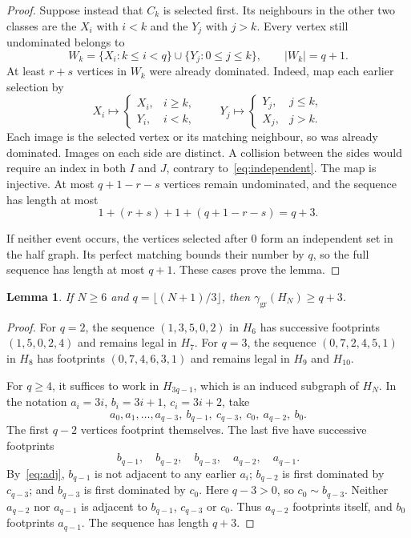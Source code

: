 \documentclass[screen]{aomart}
\newtheorem{lemma}[theorem]{Lemma}
\theoremstyle{definition}
\theoremstyle{remark}
\numberwithin{equation}{section}
\newcommand{\ggr}{\gamma_{\mathrm{gr}}}
\begin{document}
\begin{proof}
Suppose instead that $C_k$ is selected first. Its neighbours in the other two classes are the $X_i$ with $i<k$ and the $Y_j$ with $j>k$. Every vertex still undominated belongs to
\[
 W_k=\{X_i:k\le i<q\}\cup\{Y_j:0\le j\le k\},\qquad |W_k|=q+1.
\]
At least $r+s$ vertices in $W_k$ were already dominated. Indeed, map each earlier selection by
\[
 X_i\longmapsto\begin{cases}X_i,&i\ge k,\\Y_i,&i<k,\end{cases}
 \qquad
 Y_j\longmapsto\begin{cases}Y_j,&j\le k,\\X_j,&j>k.\end{cases}
\]
Each image is the selected vertex or its matching neighbour, so was already dominated. Images on each side are distinct. A collision between the sides would require an index in both $I$ and $J$, contrary to~\eqref{eq:independent}. The map is injective. At most $q+1-r-s$ vertices remain undominated, and the sequence has length at most
\[
 1+(r+s)+1+(q+1-r-s)=q+3.
\]

If neither event occurs, the vertices selected after $0$ form an independent set in the half graph. Its perfect matching bounds their number by $q$, so the full sequence has length at most $q+1$. These cases prove the lemma.
\end{proof}

\begin{lemma}\label{lem:lower-all}
If $N\ge6$ and $q=\lfloor(N+1)/3\rfloor$, then $\ggr(H_N)\ge q+3$.
\end{lemma}

\begin{proof}
For $q=2$, the sequence $(1,3,5,0,2)$ in $H_6$ has successive footprints $(1,5,0,2,4)$ and remains legal in $H_7$. For $q=3$, the sequence $(0,7,2,4,5,1)$ in $H_8$ has footprints $(0,7,4,6,3,1)$ and remains legal in $H_9$ and $H_{10}$.

For $q\ge4$, it suffices to work in $H_{3q-1}$, which is an induced subgraph of $H_N$. In the notation $a_i=3i$, $b_i=3i+1$, $c_i=3i+2$, take
\begin{equation}\label{eq:lower-sequence}
 a_0,a_1,\dots,a_{q-3},\ b_{q-1},\ c_{q-3},\ c_0,\ a_{q-2},\ b_0.
\end{equation}
The first $q-2$ vertices footprint themselves. The last five have successive footprints
\[
 b_{q-1},\quad b_{q-2},\quad b_{q-3},\quad a_{q-2},\quad a_{q-1}.
\]
By~\eqref{eq:adj}, $b_{q-1}$ is not adjacent to any earlier $a_i$; $b_{q-2}$ is first dominated by $c_{q-3}$; and $b_{q-3}$ is first dominated by $c_0$. Here $q-3>0$, so $c_0\sim b_{q-3}$. Neither $a_{q-2}$ nor $a_{q-1}$ is adjacent to $b_{q-1}$, $c_{q-3}$ or $c_0$. Thus $a_{q-2}$ footprints itself, and $b_0$ footprints $a_{q-1}$. The sequence has length $q+3$.
\end{proof}
\end{document}
